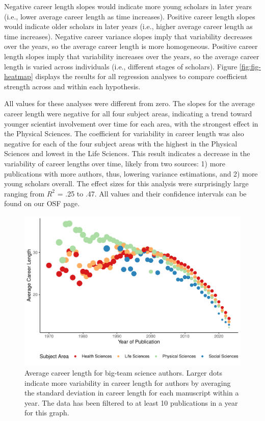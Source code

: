 \documentclass[
  man,mask,floatsintext]{apa7}
\begin{document}
Negative career length slopes would indicate more young scholars in
later years (i.e., lower average career length as time increases).
Positive career length slopes would indicate older scholars in later
years (i.e., higher average career length as time increases). Negative
career variance slopes imply that variability decreases over the years,
so the average career length is more homogeneous. Positive career length
slopes imply that variability increases over the years, so the average
career length is varied across individuals (i.e., different stages of
scholars). Figure \ref{fig:fig-heatmap} displays the results for all
regression analyses to compare coefficient strength across and within
each hypothesis.

All values for these analyses were different from zero. The slopes for
the average career length were negative for all four subject areas,
indicating a trend toward younger scientist involvement over time for
each area, with the strongest effect in the Physical Sciences. The
coefficient for variability in career length was also negative for each
of the four subject areas with the highest in the Physical Sciences and
lowest in the Life Sciences. This result indicates a decrease in the
variability of career lengths over time, likely from two sources: 1)
more publications with more authors, thus, lowering variance
estimations, and 2) more young scholars overall. The effect sizes for
this analysis were surprisingly large ranging from \(R^2\) = .25 to .47.
All values and their confidence intervals can be found on our OSF page.

\begin{figure}
\centering
\includegraphics{manuscript_scopus_files/figure-latex/fig-career-1.pdf}
\caption{\label{fig:fig-career}Average career length for big-team science authors. Larger dots indicate more variability in career length for authors by averaging the standard deviation in career length for each manuscript within a year. The data has been filtered to at least 10 publications in a year for this graph.}
\end{figure}
\end{document}
